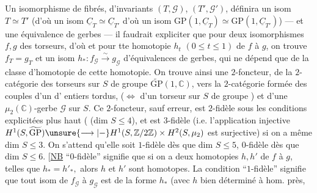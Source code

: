Un isomorphisme de fibrés, d'invariants
$(T,\mathcal G)$, $(T',\mathcal G')$, définira un isom $T\simeq T'$
(d'où un isom 
$\underline C_T\simeq\underline C_{T'}$ d'où
un isom $\mathrm{GP}(1,\underline C_T)\simeq\mathrm{GP}(1,\underline C_{T'})$) --- et
une équivalence de gerbes --- il faudrait
expliciter que pour deux isomorphismes
$f,g$ des torseurs,  d'où
et pour tte homotopie $h_t$ $(0\leq t\leq1)$ de
$f$ à $g$, on trouve $f_T=g_T$ et un
isom $h_*:f_{\mathcal G}\xrightarrow{\sim}g_{\mathcal G}$ d'équivalences de
gerbes, qui ne dépend que de la classe
d'homotopie de cette homotopie. On
trouve ainsi une $2$-foncteur, de la
$2$-catégorie des  torseurs sur $S$
de groupe $\widetilde{\mathrm{GP}}(1,\mathbb C)$, vers la $2$-catégorie
formée des couples  d'un
  d'%
entiers tordus,  ($\Longleftrightarrow$ d'un torseur sur
$S$ de groupe  ) et d'une
 $\mu_2(\mathbb C)$-gerbe $\mathcal G$ sur $S$. Ce
$2$-foncteur, sauf erreur, est $2$-fidèle
sous les conditions explicitées plus
haut ( (dim $S\leq4$), et
est $3$-fidèle (i.e. l'application injective
$H^1(S,\widetilde{\mathrm{GP}})\unsure{\longrightarrow|{-}}
H^1(S,\mathbb Z/2\mathbb Z)\times H^2(S,\mu_2)$ est surjective)
si on a même dim $S\leq3$. On s'attend qu'elle
soit $1$-fidèle dès que dim $S\leq5$, $0$-fidèle
dès que dim $S\leq6$.
[\uline{NB}  ``$0$-fidèle'' signifie
que si  on a deux homotopies $h,h'$ de $f$ à $g$,
telles que $h_*=h'_*,$ alors $h$ et $h'$ sont homotopes.
La condition ``$1$-fidèle'' signifie  que tout
isom de $f_{\mathcal G}$ à $g_{\mathcal G}$
 est de la
forme $h_*$ (avec $h$ bien déterminé à hom. près,
